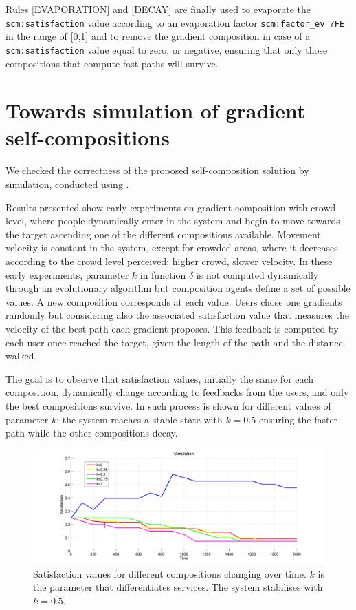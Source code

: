 \documentclass[12pt,a4paper,twoside,openright]{book}
\begin{document}
Rules [EVAPORATION] and [DECAY] are finally used to evaporate the \texttt{scm:satisfaction} value according to an evaporation factor \texttt{scm:factor\_ev ?FE} in the range of [0,1] and to remove the gradient composition in case of a \texttt{scm:satisfaction} value equal to zero, or negative, ensuring that only those compositions that compute fast paths will survive.

\section{Towards simulation of gradient self-compositions}

We checked the correctness of the proposed self-composition solution by simulation, conducted using \alchemist{}.

Results presented show early experiments on gradient composition with crowd level, where people dynamically enter in the system and begin to move towards the target ascending one of the different compositions available. Movement velocity is constant in the system, except for crowded areas, where it decreases according to the crowd level perceived: higher crowd, slower velocity.
%
In these early experiments, parameter $k$ in function $\delta$ is not computed dynamically through an evolutionary algorithm but composition agents define a set of possible values. A new composition corresponds at each value.
%
Users chose one gradients randomly but considering also the associated satisfaction value  that measures the velocity of the best path each gradient proposes. This feedback is computed by each user once reached the target, given the length of the path and the distance walked.

The goal is to observe that satisfaction values, initially the same for each composition, dynamically change according to feedbacks from the users, and only the best compositions survive. In  such process is shown for different values of parameter $k$: the system reaches a stable state with $k=0.5$ ensuring the faster path while the other compositions decay.

\begin{figure}
	\begin{center}
 		\includegraphics[width=\textwidth]{img/sc-simu.pdf}
\end{center}
\caption{Satisfaction values for different compositions changing over time. $k$ is the parameter that differentiates services. The system stabilises with $k=0.5$.}
\label{fig:scsimu} 
\end{figure}
\end{document}
